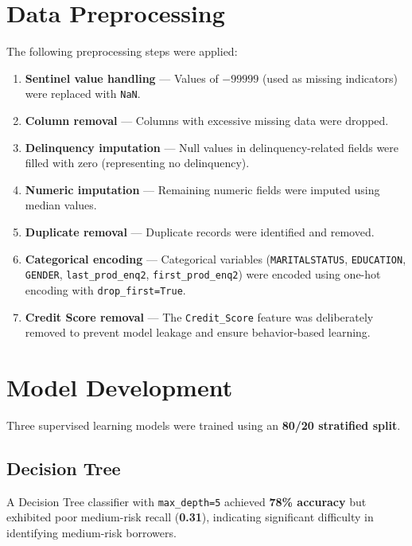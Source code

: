 \documentclass[12pt,a4paper]{article}
\begin{document}
\section{Data Preprocessing}

The following preprocessing steps were applied:

\begin{enumerate}[nosep]
    \item \textbf{Sentinel value handling} --- Values of $-99999$ (used as missing indicators) were replaced with \texttt{NaN}.
    \item \textbf{Column removal} --- Columns with excessive missing data were dropped.
    \item \textbf{Delinquency imputation} --- Null values in delinquency-related fields were filled with zero (representing no delinquency).
    \item \textbf{Numeric imputation} --- Remaining numeric fields were imputed using median values.
    \item \textbf{Duplicate removal} --- Duplicate records were identified and removed.
    \item \textbf{Categorical encoding} --- Categorical variables (\texttt{MARITALSTATUS}, \texttt{EDUCATION}, \texttt{GENDER}, \texttt{last\_prod\_enq2}, \texttt{first\_prod\_enq2}) were encoded using one-hot encoding with \texttt{drop\_first=True}.
    \item \textbf{Credit Score removal} --- The \texttt{Credit\_Score} feature was deliberately removed to prevent model leakage and ensure behavior-based learning.
\end{enumerate}

\section{Model Development}

Three supervised learning models were trained using an \textbf{80/20 stratified split}.

\subsection{Decision Tree}

A Decision Tree classifier with \texttt{max\_depth=5} achieved \textbf{78\% accuracy} but exhibited poor medium-risk recall (\textbf{0.31}), indicating significant difficulty in identifying medium-risk borrowers.
\end{document}
